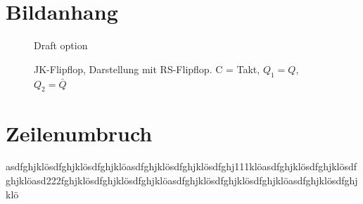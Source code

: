 \documentclass[12pt, a4paper, twopage]{scrartcl}
\begin{document}
\clearpage


\begin{appendix}
\setcounter{figure}{0} %
\renewcommand{\thefigure}{A\arabic{figure}} %

\section{Bildanhang}


\begin{figure}[h!]
\centering
{}
  \caption{Draft option \vspace{27pt}}%
  \label{fig:jkflipflop}
\endminipage\hspace{.5cm}
%
  \caption{JK-Flipflop, Darstellung mit RS-Flipflop. C = Takt, $Q_1 = Q$, $Q_2 = \bar{Q}$}%
  \label{fig:JKmitRS}
\endminipage
\end{figure}


\section{Zeilenumbruch}
asdfghjklösdfghjklösdfghjklöasdfghjklösdfghjklösdfghj111klöasdfghjklösdfghjklösdfghjklöasd222\-fghjklösdfghjklösdfghjklöasdfghjklösdfghjklösdfghjklöasdfghjklösdfghjklö




\end{appendix}
\end{document}
